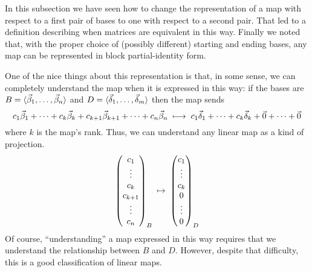 In this subsection
we have seen how to change the representation of a map with
respect to a first pair of bases to one with respect to a second pair.
That led to a definition describing when matrices are equivalent in
this way.
Finally we noted that,
with the proper choice of (possibly different) starting and ending bases, any
map can be represented in block partial-identity form.

One of the nice things about this representation is that,
in some sense, we can completely understand the map when it is
expressed in this way:
if the bases are
\( B=\langle\vec{\beta}_1,\dots,\vec{\beta}_n\rangle \)
and
\( D=\langle\vec{\delta}_1,\dots,\vec{\delta}_m\rangle \)
then the map sends
\begin{equation*}
  c_1\vec{\beta}_1+\dots+c_k\vec{\beta}_k+c_{k+1}\vec{\beta}_{k+1}+\dots
     +c_n\vec{\beta}_n
  \;\longmapsto\;
  c_1\vec{\delta}_1+\dots+c_k\vec{\delta}_k+\vec{0}+\dots+\vec{0}
\end{equation*}
where \( k \) is the map's rank.
Thus, we can understand any linear map as a kind of projection.
\begin{equation*}
  \begin{pmatrix} c_1 \\ \vdots \\ c_k \\ c_{k+1} \\ \vdots \\ c_n \end{pmatrix}_B
  \;\mapsto\;
  \begin{pmatrix} c_1 \\ \vdots \\ c_k \\ 0 \\ \vdots \\ 0 \end{pmatrix}_D
\end{equation*}
Of course, ``understanding'' a map expressed in this way 
requires that we understand the relationship between \( B \) and \( D \).
However, despite that difficulty, 
this is a good classification of linear maps.

